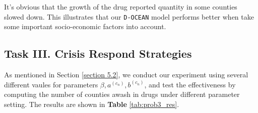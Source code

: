 \documentclass[a4paper]{article}
\begin{document}
\renewcommand{\baselinestretch}{1.2}
\vspace{8pt}
\begin{table}[h]
\begin{center}
\caption{Mean total drug reported quantity inside the cluster class.}
\label{tab:prob2_res}
\end{center}
\end{table}
\renewcommand{\baselinestretch}{1.0}


It's obvious that the growth of the drug reported quantity in some counties slowed down. This illustrates that our \texttt{D-OCEAN} model performs better when take some important socio-economic factors into account. 

\subsection{\textbf{Task III.} Crisis Respond Strategies}
As mentioned in Section \ref{section 5.2}, we conduct our experiment using several different vaules for parameters $\beta, a^{(c_n)}, b^{(c_n)}$, and test the effectiveness by computing the number of counties awash in drugs under different parameter setting. The results are shown in \textbf{Table} \ref{tab:prob3_res}.\\

\renewcommand{\baselinestretch}{1.2}
\vspace{8pt}
\begin{table}[h]
\begin{center}
\caption{Quantity results of the effectiveness of strategies in \textbf{Task III}. (Ratio $\delta$ - higher is better - is defined in Section \ref{section 5.2}.)}
\label{tab:prob3_res}
\end{center}
\end{table}
\renewcommand{\baselinestretch}{1.0}
\end{document}
